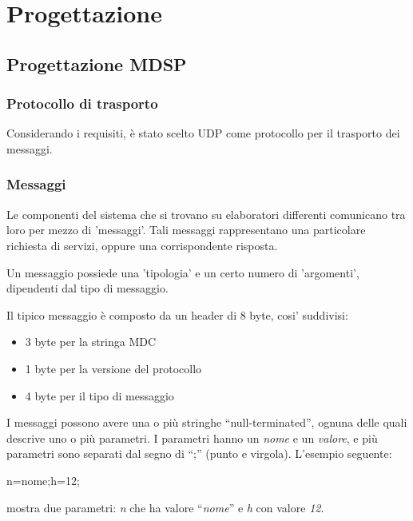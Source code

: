 \chapter{Progettazione}

\section{Progettazione MDSP}

\subsection{Protocollo di trasporto}
Considerando i requisiti, è stato scelto UDP come protocollo per il trasporto
dei messaggi.

\subsection{Messaggi}


Le componenti del sistema che si trovano su elaboratori differenti comunicano tra
loro per mezzo di 'messaggi'. Tali messaggi rappresentano una particolare
richiesta di servizi, oppure una corrispondente risposta.

Un messaggio possiede una 'tipologia' e un certo numero di 'argomenti', dipendenti dal tipo di messaggio.

Il tipico messaggio è composto da un header di 8 byte, cosi' suddivisi:



\begin{itemize}
\item 3 byte per la stringa MDC

\item 1 byte per la versione del protocollo

\item 4 byte per il tipo di messaggio
\end{itemize}

I messaggi possono avere una o più stringhe ``null-terminated'',
ognuna delle quali descrive uno o più parametri. I parametri hanno un
\emph{nome} e un \emph{valore}, e più parametri sono separati dal segno di
``;'' (punto e virgola). L'esempio seguente:

\begin{code}
n=nome;h=12;
\end{code}

mostra due parametri: \emph{n} che ha valore ``\emph{nome}'' e \emph{h} con
valore \emph{12}.

